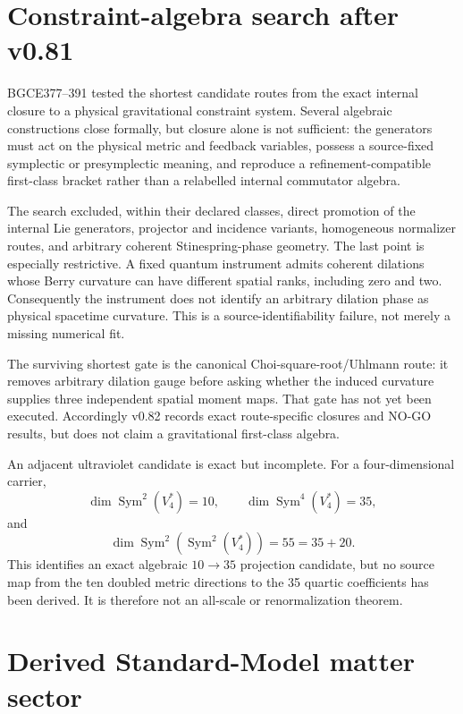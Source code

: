 \documentclass[11pt]{article}
\theoremstyle{definition}
\theoremstyle{remark}
\newcommand{\Sym}{\operatorname{Sym}}
\begin{document}
\section{Constraint-algebra search after v0.81}\label{sec:constraints082}

BGCE377--391 tested the shortest candidate routes from the exact internal closure to a physical gravitational constraint system. Several algebraic constructions close formally, but closure alone is not sufficient: the generators must act on the physical metric and feedback variables, possess a source-fixed symplectic or presymplectic meaning, and reproduce a refinement-compatible first-class bracket rather than a relabelled internal commutator algebra.

The search excluded, within their declared classes, direct promotion of the internal Lie generators, projector and incidence variants, homogeneous normalizer routes, and arbitrary coherent Stinespring-phase geometry. The last point is especially restrictive. A fixed quantum instrument admits coherent dilations whose Berry curvature can have different spatial ranks, including zero and two. Consequently the instrument does not identify an arbitrary dilation phase as physical spacetime curvature. This is a source-identifiability failure, not merely a missing numerical fit.

The surviving shortest gate is the canonical Choi-square-root/Uhlmann route: it removes arbitrary dilation gauge before asking whether the induced curvature supplies three independent spatial moment maps. That gate has not yet been executed. Accordingly v0.82 records exact route-specific closures and NO-GO results, but does not claim a gravitational first-class algebra.

An adjacent ultraviolet candidate is exact but incomplete. For a four-dimensional carrier,
\begin{equation}
 \dim\Sym^2(V_4^*)=10,
 \qquad
 \dim\Sym^4(V_4^*)=35,
\end{equation}
and
\begin{equation}
 \dim\Sym^2\!\left(\Sym^2(V_4^*)\right)=55=35+20.
\end{equation}
This identifies an exact algebraic $10\to35$ projection candidate, but no source map from the ten doubled metric directions to the 35 quartic coefficients has been derived. It is therefore not an all-scale or renormalization theorem.

\section{Derived Standard-Model matter sector}\label{sec:sm082}
\end{document}
